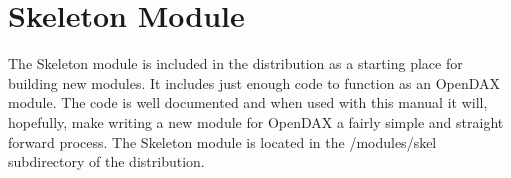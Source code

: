 \appendix



\chapter{Skeleton Module}
The Skeleton module is included in the distribution as a starting place for building new modules.  It includes just enough code to function as an OpenDAX module.  The code is well documented and when used with this manual it will, hopefully, make writing a new module for OpenDAX a fairly simple and straight forward process.  The Skeleton module is located in the /modules/skel subdirectory of the distribution.

%
%

%

%

\printindex

